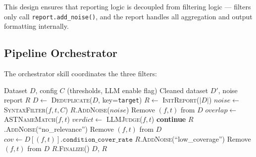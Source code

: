 \documentclass[acmlarge,nonacm,screen]{acmart}
\begin{document}
This design ensures that reporting logic is decoupled from filtering logic --- filters only call \texttt{report.add\_noise()}, and the report handles all aggregation and output formatting internally.

\subsection{Pipeline Orchestrator}

The orchestrator skill coordinates the three filters:

\begin{algorithm}[!htbp]
\caption{CleanTest-Agent Pipeline}
\label{alg:pipeline}
\small
\begin{algorithmic}[1]
\Require Dataset $D$, config $C$ (thresholds, LLM enable flag)
\Ensure Cleaned dataset $D'$, noise report $R$
\State $D \gets$ \textsc{Deduplicate}($D$, key=\texttt{target})
\State $R \gets$ \textsc{InitReport}($|D|$)
\State {}
    \State $noise \gets$ \textsc{SyntaxFilter}($f, t, C$)
        \State $R$.\textsc{AddNoise}($noise$)
        \State Remove $(f, t)$ from $D$
    \EndIf
\EndFor
\State {}
    \State $overlap \gets$ \textsc{ASTNameMatch}($f, t$)
            \State $verdict \gets$ \textsc{LLMJudge}($f, t$)
                \State \textbf{continue}
            \EndIf
        \EndIf
        \State $R$.\textsc{AddNoise}(``no\_relevance'')
        \State Remove $(f, t)$ from $D$
    \EndIf
\EndFor
\State {}
        \State {}
            \State $cov \gets D[(f,t)].\texttt{condition\_cover\_rate}$
                \State $R$.\textsc{AddNoise}(``low\_coverage'')
                \State Remove $(f, t)$ from $D$
            \EndIf
        \EndFor
    \Else
        \State {}
        \State {}
        \State {}
        \State {}
    \EndIf
\EndIf
\State $R$.\textsc{Finalize}()
\State \Return $D$, $R$
\end{algorithmic}
\end{algorithm}
\end{document}
